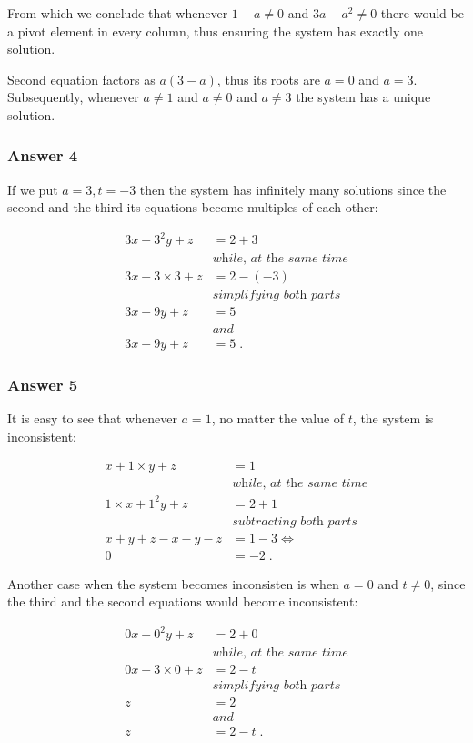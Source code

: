 \documentclass[11pt]{article}
\begin{document}
From which we conclude that whenever \(1-a \neq 0\) and \(3a-a^2 \neq 0\) there
would be a pivot element in every column, thus ensuring the system has
exactly one solution.

Second equation factors as \(a(3-a)\), thus its roots are \(a=0\) and \(a=3\).
Subsequently, whenever \(a \neq 1\) and \(a \neq 0\) and \(a \neq 3\) the system
has a unique solution.

\subsubsection{Answer 4}
\label{sec:orgheadline5}
If we put \(a = 3, t = -3\) then the system has infinitely many solutions since
the second and the third its equations become multiples of each other:

\begin{align*}
  3x + 3^2y + z &= 2+3 \\
    &\textit{while, at the same time} \\
  3x + 3 \times 3 + z &= 2-(-3) \\
    &\textit{simplifying both parts} \\
  3x + 9y + z &= 5 \\
    &\textit{and} \\
  3x + 9y + z &= 5\;.
\end{align*}

\subsubsection{Answer 5}
\label{sec:orgheadline6}
It is easy to see that whenever \(a = 1\), no matter the value of \(t\), the
system is inconsistent:

\begin{align*}
  x + 1 \times y + z &= 1 \\
    &\textit{while, at the same time} \\
  1 \times x + 1^2y + z &= 2+1 \\
    &\textit{subtracting both parts} \\
  x + y + z - x - y - z &= 1 - 3 \iff \\
  0 &= -2\;.
\end{align*}

Another case when the system becomes inconsisten is when \(a = 0\) and \(t \neq
    0\), since the third and the second equations would become inconsistent:

\begin{align*}
  0x + 0^2y + z &= 2+0 \\
    &\textit{while, at the same time} \\
  0x + 3 \times 0 + z &= 2-t \\
    &\textit{simplifying both parts} \\
  z &= 2 \\
    &\textit{and} \\
  z &= 2-t\;.
\end{align*}
\end{document}
